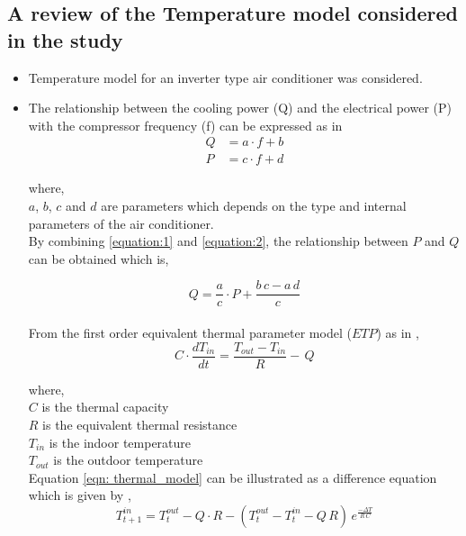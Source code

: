 \documentclass[12pt,a4paper]{article}
\begin{document}
  
\subsection*{\normalsize A review of the Temperature model considered in the study}

\begin{itemize}
    \item Temperature model for an inverter type air conditioner was considered.
    
    \item The relationship between the cooling power (Q) and the electrical power (P) with the compressor frequency (f) can be expressed as in \cite{7890446}
    \begin{align}
        \label{equation:1}
        Q &= a\cdot f + b \\
        \label{equation:2}
        P &= c\cdot f + d
    \end{align}
  
  where,\\

$a$, $b$, $c$ and $d$ are parameters which depends on the type and internal parameters of the air conditioner.\\

By combining \ref{equation:1} and \ref{equation:2}, the relationship between $P$ and $Q$ can be obtained which is,

\begin{equation}
    \label{eqn: P_and_Q}
    Q = \frac{a}{c}\cdot P + \frac{b\,c -a\,d}{c}
\end{equation} \\ 


From the first order equivalent thermal parameter model ($ETP$) as in \cite{6168821},
\begin{equation}
    \label{eqn: thermal_model}
    C\cdot \frac{dT_{in}}{dt} = \frac{T_{out}-T_{in}}{R} -\,Q
\end{equation}

where,\\

$C$ is the thermal capacity\\
$R$ is the equivalent thermal resistance\\
$T_{in}$ is the indoor temperature\\
$T_{out}$ is the outdoor temperature\\


Equation \eqref{eqn: thermal_model} can be illustrated as a difference equation which is given by \cite{8750809},
\begin{equation}
    \label{eq:discretised_ETP_model}
    T_{t+1}^{in} =  T_{t}^{out} - Q\cdot R - (T_{t}^{out}-T_{t}^{in}-Q\,R)\,e^{\frac{-\Delta T}{R\,C}} %
\end{equation}


\end{itemize}
\end{document}
